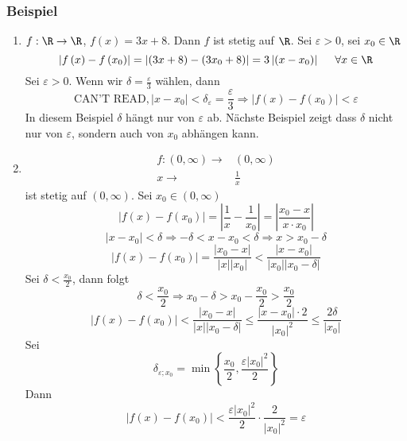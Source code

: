 \subsubsection*{Beispiel}
\begin{enumerate}
\item $f:\R\to\R$, $f(x)=3x+8$. Dann $f$ ist stetig auf $\R$. Sei $\varepsilon>0$, sei $x_0\in\R$
\[\left| {f\left( x \right) - f\left( {{x_0}} \right)} \right| = \left| {\left( {3x + 8} \right) - \left( {3{x_0} + 8} \right)} \right| = 3\left| {\left( {x - {x_0}} \right)} \right|\hspace{5mm}\forall x \in \R\]
Sei $\varepsilon>0$. Wenn wir $\delta=\frac{\varepsilon}{3}$ wählen, dann 
\[ \text{CAN'T READ}, \left| {x - {x_0}} \right| < {\delta _\varepsilon } = \frac{\varepsilon }{3} \Rightarrow \left| {f\left( x \right) - f\left( {{x_0}} \right)} \right| < \varepsilon \]
In diesem Beispiel $\delta$ hängt nur von $\varepsilon$ ab. Nächste Beispiel zeigt dass $\delta$ nicht nur von $\varepsilon$, sondern auch von $x_0$ abhängen kann.
\item \begin{align*}
f:\left( 0,\infty\right)\to&\left( 0,\infty\right)\\
x\to&\frac{1}{x}
\end{align*}
ist stetig auf $\left( 0,\infty\right)$. Sei $x_0\in\left( 0,\infty\right)$
\[\left| {f\left( x \right) - f\left( {{x_0}} \right)} \right| = \left| {\frac{1}{x} - \frac{1}{{{x_0}}}} \right| = \left| {\frac{{{x_0} - x}}{{x \cdot {x_0}}}} \right|\]
\[\left| {x - {x_0}} \right| < \delta  \Rightarrow  - \delta  < x - {x_0} < \delta  \Rightarrow x > {x_0} - \delta \]
\[\left| {f\left( x \right) - f\left( {{x_0}} \right)} \right| = \frac{{\left| {{x_0} - x} \right|}}{{\left| x \right|\left| {{x_0}} \right|}} < \frac{{\left| {x - {x_0}} \right|}}{{\left| {{x_0}} \right|\left| {{x_0} - \delta } \right|}}\]
Sei $\delta<\frac{x_0}{2}$, dann folgt 
\[\delta  < \frac{{{x_0}}}{2} \Rightarrow {x_0} - \delta  > {x_0} - \frac{{{x_0}}}{2} > \frac{{{x_0}}}{2}\]
\[\left| {f\left( x \right) - f\left( {{x_0}} \right)} \right| < \frac{{\left| {{x_0} - x} \right|}}{{\left| x \right|\left| {{x_0} - \delta } \right|}} \le \frac{{\left| {x - {x_0}} \right| \cdot 2}}{{{{\left| {{x_0}} \right|}^2}}} \le \frac{{2\delta }}{{\left| {{x_0}} \right|}}\]
Sei 
\[{\delta _{\varepsilon ;{x_0}}} = \min \left\{ {\frac{{{x_0}}}{2},\frac{{\varepsilon {{\left| {{x_0}} \right|}^2}}}{2}} \right\}\]
Dann
\[\left| {f\left( x \right) - f\left( {{x_0}} \right)} \right| < \frac{{\varepsilon {{\left| {{x_0}} \right|}^2}}}{2} \cdot \frac{2}{{{{\left| {{x_0}} \right|}^2}}} = \varepsilon \]
\end{enumerate}

